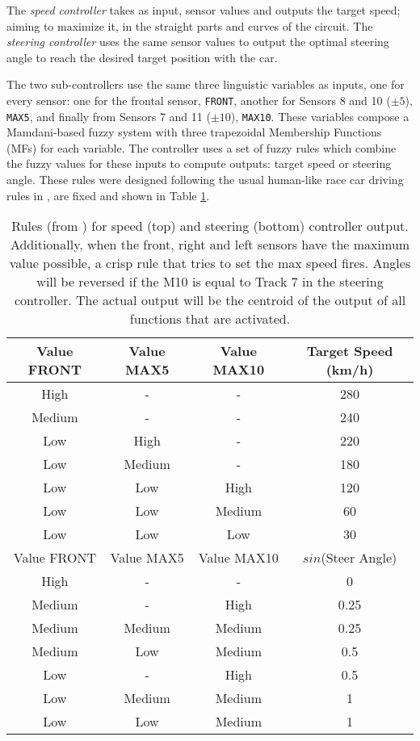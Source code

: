 \documentclass[10pt,journal,compsoc]{IEEEtran}
\begin{document}
The \textit{speed controller} takes as input, sensor values and outputs the target speed; aiming to maximize it, in the straight parts and curves of the circuit. The \textit{steering controller} uses the same sensor values to output the optimal steering angle to reach the desired target position with the car.

The two sub-controllers use the same three linguistic variables as
inputs, one for every sensor: one for the frontal sensor,
\texttt{FRONT}, another for Sensors 8 and 10 ($\pm 5$\textdegree),
\texttt{MAX5}, and finally from Sensors 7 and 11 ($\pm
10$\textdegree), \texttt{MAX10}. These variables compose a Mamdani-based fuzzy
system \cite{iancu2012} with three trapezoidal Membership Functions
(MFs) for each variable. The controller uses a set of fuzzy rules
which combine the fuzzy values for these inputs to compute outputs:
target speed or steering angle.
These rules were designed following the usual human-like race car driving
rules in \cite{salem_evo18}, are fixed and shown in Table \ref{tab:output}.


\begin{table}[h!tb]
  \centering
  {\scriptsize
    \caption{Rules  (from \cite{salem_evo18}) for speed (top) and steering
      (bottom) controller output. Additionally, when 
      the front, right and left sensors have the maximum value
      possible, a crisp rule that tries to set the max speed
      fires.  Angles will be reversed
      if the M10 is equal to Track 7 in the steering controller. The
      actual output will be the centroid of the output of all functions
      that are activated. \label{tab:output}}
    \begin{tabular}{|c|c|c||c|}
\hline
      Value FRONT & Value MAX5 & Value MAX10 & Target Speed (km/h) \\
      \hline
      High & - & - & 280 \\
      Medium & - & - & 240 \\
      Low & High & - & 220 \\
      Low & Medium & - & 180 \\
      Low & Low & High & 120 \\
      Low & Low & Medium & 60 \\           
      Low & Low & Low & 30 \\     
\hline
\hline
      Value FRONT & Value MAX5 & Value MAX10 & $sin$(Steer Angle) \\
\hline
      High & - & - & 0 \\
      Medium & - & High & 0.25 \\
      Medium & Medium & Medium & 0.25 \\
      Medium & Low & Medium & 0.5 \\
      Low & - & High & 0.5 \\
      Low & Medium & Medium & 1 \\
      Low & Low & Medium & 1 \\ 
      
\hline
\end{tabular}
}
\end{table}
\end{document}
